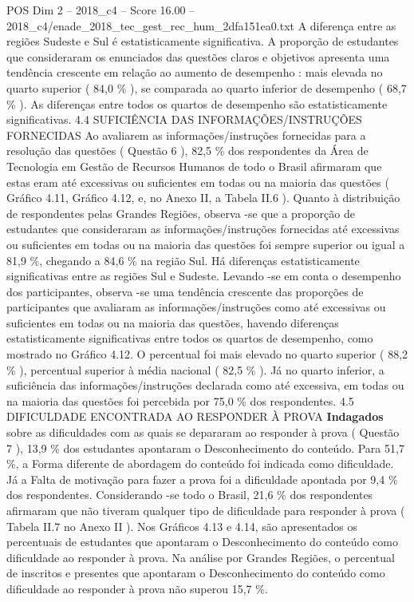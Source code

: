 \begin{textsample}{POS Dim 2 – 2018\_c4 – Score 16.00 – 2018\_c4/enade\_2018\_tec\_gest\_rec\_hum\_2dfa151ea0.txt}
A diferença entre as regiões Sudeste e Sul é estatisticamente significativa.
A proporção de estudantes que consideraram os enunciados das questões claros e objetivos apresenta uma tendência crescente em relação ao aumento de desempenho : mais elevada no quarto superior ( 84,0 \% ), se comparada ao quarto inferior de desempenho ( 68,7 \% ).
As diferenças entre todos os quartos de desempenho são estatisticamente significativas. 4.4 SUFICIÊNCIA DAS INFORMAÇÕES/INSTRUÇÕES FORNECIDAS Ao avaliarem as informações/instruções fornecidas para a resolução das questões ( Questão 6 ), 82,5 \% dos respondentes da Área de Tecnologia em Gestão de Recursos Humanos de todo o Brasil afirmaram que estas eram até excessivas ou suficientes em todas ou na maioria das questões ( Gráfico 4.11, Gráfico 4.12, e, no Anexo II, a Tabela II.6 ).
Quanto à distribuição de respondentes pelas Grandes Regiões, observa -se que a proporção de estudantes que consideraram as informações/instruções fornecidas até excessivas ou suficientes em todas ou na maioria das questões foi sempre superior ou igual a 81,9 \%, chegando a 84,6 \% na região Sul.
Há diferenças estatisticamente significativas entre as regiões Sul e Sudeste.
Levando -se em conta o desempenho dos participantes, observa -se uma tendência crescente das proporções de participantes que avaliaram as informações/instruções como até excessivas ou suficientes em todas ou na maioria das questões, havendo diferenças estatisticamente significativas entre todos os quartos de desempenho, como mostrado no Gráfico 4.12.
O percentual foi mais elevado no quarto superior ( 88,2 \% ), percentual superior à média nacional ( 82,5 \% ).
Já no quarto inferior, a suficiência das informações/instruções declarada como até excessiva, em todas ou na maioria das questões foi percebida por 75,0 \% dos respondentes. 4.5 DIFICULDADE ENCONTRADA AO RESPONDER À PROVA \textbf{Indagados} sobre as dificuldades com as quais se depararam ao responder à prova ( Questão 7 ), 13,9 \% dos estudantes apontaram o Desconhecimento do conteúdo.
Para 51,7 \%, a Forma diferente de abordagem do conteúdo foi indicada como dificuldade.
Já a Falta de motivação para fazer a prova foi a dificuldade apontada por 9,4 \% dos respondentes.
Considerando -se todo o Brasil, 21,6 \% dos respondentes afirmaram que não tiveram qualquer tipo de dificuldade para responder à prova ( Tabela II.7 no Anexo II ).
Nos Gráficos 4.13 e 4.14, são apresentados os percentuais de estudantes que apontaram o Desconhecimento do conteúdo como dificuldade ao responder à prova.
Na análise por Grandes Regiões, o percentual de inscritos e presentes que apontaram o Desconhecimento do conteúdo como dificuldade ao responder à prova não superou 15,7 \%.

\end{textsample}
